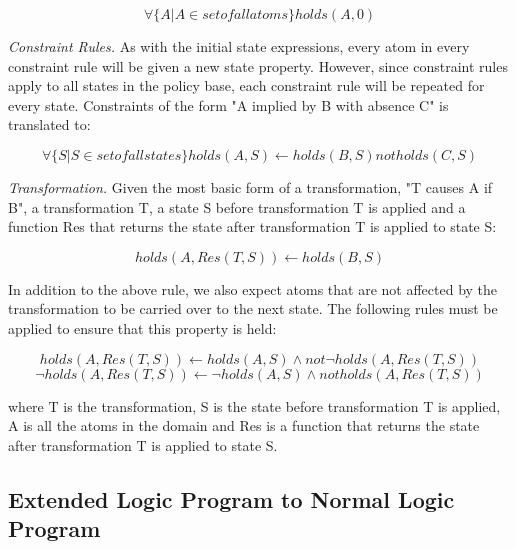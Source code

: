 \documentclass{llncs}
\begin{document}
        \begin{equation}
          \forall\{A | A \in set of all atoms\} holds(A, 0)
        \end{equation}

        \emph{Constraint Rules.} As with the initial state expressions, every
        atom in every constraint rule will be given a new state property.
        However, since constraint rules apply to all states in the policy
        base, each constraint rule will be repeated for every state.
        Constraints of the form "A implied by B with absence C" is translated
        to:

        \begin{equation}
          \forall\{S | S \in set of all states\}
          holds(A, S) \leftarrow holds(B, S) not holds(C, S)
        \end{equation}

        \emph{Transformation.} Given the most basic form of a transformation,
        "T causes A if B", a transformation T, a state S before transformation
        T is applied and a function Res that returns the state after
        transformation T is applied to state S:

        \begin{equation}
          holds(A, Res(T, S)) \leftarrow holds(B, S)
        \end{equation}
 
        In addition to the above rule, we also expect atoms that are not
        affected by the transformation to be carried over to the next state.
        The following rules must be applied to ensure that this property is
        held:

        \begin{equation}
          holds(A, Res(T, S)) \leftarrow holds(A, S) \land not \lnot holds(A, Res(T, S))
        \end{equation}
        \begin{equation}
          \lnot holds(A, Res(T, S)) \leftarrow \lnot holds(A, S) \land not holds(A, Res(T, S))
        \end{equation}

        where T is the transformation, S is the state before transformation
        T is applied, A is all the atoms in the domain and Res is a function
        that returns the state after transformation T is applied to state S.

    \subsection{Extended Logic Program to Normal Logic Program}
\end{document}
